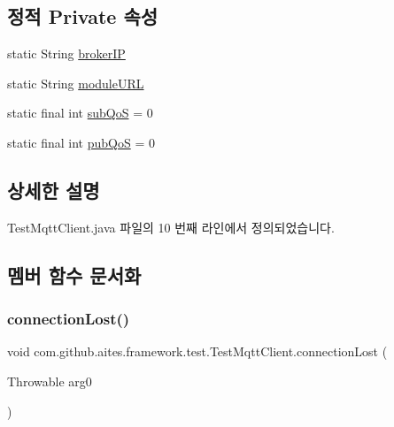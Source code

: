 \subsection*{정적 Private 속성}
\begin{DoxyCompactItemize}
\item 
static String \mbox{\hyperlink{classcom_1_1github_1_1aites_1_1framework_1_1test_1_1_test_mqtt_client_a84637c3f2dcb9a4d2dfbfe9bdd33598c}{broker\+IP}}
\item 
static String \mbox{\hyperlink{classcom_1_1github_1_1aites_1_1framework_1_1test_1_1_test_mqtt_client_aa6e2b3ad672e6e3fa31ff5fb6a85a891}{module\+U\+RL}}
\item 
static final int \mbox{\hyperlink{classcom_1_1github_1_1aites_1_1framework_1_1test_1_1_test_mqtt_client_a28e42eb51d4507e92c443fe60ba019a7}{sub\+QoS}} = 0
\item 
static final int \mbox{\hyperlink{classcom_1_1github_1_1aites_1_1framework_1_1test_1_1_test_mqtt_client_ab0f357c081f4614618eeb1647573c34a}{pub\+QoS}} = 0
\end{DoxyCompactItemize}


\subsection{상세한 설명}


Test\+Mqtt\+Client.\+java 파일의 10 번째 라인에서 정의되었습니다.



\subsection{멤버 함수 문서화}
\mbox{\label{classcom_1_1github_1_1aites_1_1framework_1_1test_1_1_test_mqtt_client_a55caf2fc4e06f07ff8c8135cfaa2c9d6}} 
\subsubsection{\texorpdfstring{connection\+Lost()}{connectionLost()}}
{\footnotesize\ttfamily void com.\+github.\+aites.\+framework.\+test.\+Test\+Mqtt\+Client.\+connection\+Lost (\begin{DoxyParamCaption}\item[{Throwable}]{arg0 }\end{DoxyParamCaption})}



